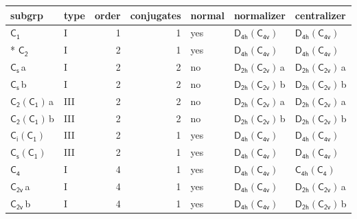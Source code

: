 \documentclass[10pt,a4paper]{article}
\numberwithin{equation}{section}
\newcommand{\grp}[1]{\mathsf{#1}}
\newcommand{\clsletter}[1]{\,{\scriptsize\color{black!55}#1}}
\begin{document}
{\small\begin{longtable}{@{}llrrlll@{}}\toprule
subgrp & type & order & conjugates & normal & normalizer & centralizer\\\midrule\endhead
\bottomrule\endfoot\endlastfoot
\href{../../../rotation/data/pdf/C1.pdf}{$\grp{C_{1}}$} & I & 1 & 1 & yes & \href{D4h-C4v.pdf}{$\grp{D_{4h}}(\grp{C_{4v}})$} & \href{D4h-C4v.pdf}{$\grp{D_{4h}}(\grp{C_{4v}})$}\\*
\href{../../../rotation/data/pdf/C2.pdf}{$\grp{C_{2}}$} & I & 2 & 1 & yes & \href{D4h-C4v.pdf}{$\grp{D_{4h}}(\grp{C_{4v}})$} & \href{D4h-C4v.pdf}{$\grp{D_{4h}}(\grp{C_{4v}})$}\\
\href{../../../rotation/data/pdf/C1v.pdf}{$\grp{C_{s}}$}\clsletter{a} & I & 2 & 2 & no & \href{D2h-C2v.pdf}{$\grp{D_{2h}}(\grp{C_{2v}})$}\clsletter{a} & \href{D2h-C2v.pdf}{$\grp{D_{2h}}(\grp{C_{2v}})$}\clsletter{a}\\
\href{../../../rotation/data/pdf/C1v.pdf}{$\grp{C_{s}}$}\clsletter{b} & I & 2 & 2 & no & \href{D2h-C2v.pdf}{$\grp{D_{2h}}(\grp{C_{2v}})$}\clsletter{b} & \href{D2h-C2v.pdf}{$\grp{D_{2h}}(\grp{C_{2v}})$}\clsletter{b}\\
\href{C2-C1.pdf}{$\grp{C_{2}}(\grp{C_{1}})$}\clsletter{a} & III & 2 & 2 & no & \href{D2h-C2v.pdf}{$\grp{D_{2h}}(\grp{C_{2v}})$}\clsletter{a} & \href{D2h-C2v.pdf}{$\grp{D_{2h}}(\grp{C_{2v}})$}\clsletter{a}\\
\href{C2-C1.pdf}{$\grp{C_{2}}(\grp{C_{1}})$}\clsletter{b} & III & 2 & 2 & no & \href{D2h-C2v.pdf}{$\grp{D_{2h}}(\grp{C_{2v}})$}\clsletter{b} & \href{D2h-C2v.pdf}{$\grp{D_{2h}}(\grp{C_{2v}})$}\clsletter{b}\\
\href{S2-C1.pdf}{$\grp{C_{i}}(\grp{C_{1}})$} & III & 2 & 1 & yes & \href{D4h-C4v.pdf}{$\grp{D_{4h}}(\grp{C_{4v}})$} & \href{D4h-C4v.pdf}{$\grp{D_{4h}}(\grp{C_{4v}})$}\\
\href{C1v-C1.pdf}{$\grp{C_{s}}(\grp{C_{1}})$} & III & 2 & 1 & yes & \href{D4h-C4v.pdf}{$\grp{D_{4h}}(\grp{C_{4v}})$} & \href{D4h-C4v.pdf}{$\grp{D_{4h}}(\grp{C_{4v}})$}\\
\href{../../../rotation/data/pdf/C4.pdf}{$\grp{C_{4}}$} & I & 4 & 1 & yes & \href{D4h-C4v.pdf}{$\grp{D_{4h}}(\grp{C_{4v}})$} & \href{C4h-C4.pdf}{$\grp{C_{4h}}(\grp{C_{4}})$}\\
\href{../../../rotation/data/pdf/C2v.pdf}{$\grp{C_{2v}}$}\clsletter{a} & I & 4 & 1 & yes & \href{D4h-C4v.pdf}{$\grp{D_{4h}}(\grp{C_{4v}})$} & \href{D2h-C2v.pdf}{$\grp{D_{2h}}(\grp{C_{2v}})$}\clsletter{a}\\
\href{../../../rotation/data/pdf/C2v.pdf}{$\grp{C_{2v}}$}\clsletter{b} & I & 4 & 1 & yes & \href{D4h-C4v.pdf}{$\grp{D_{4h}}(\grp{C_{4v}})$} & \href{D2h-C2v.pdf}{$\grp{D_{2h}}(\grp{C_{2v}})$}\clsletter{b}\\

\end{longtable}}
\end{document}
